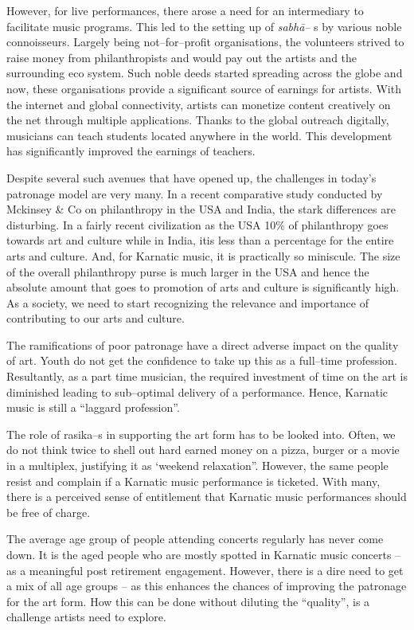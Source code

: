 However, for live performances, there arose a need for an intermediary to facilitate music programs. This led to the setting up of \textit{sabhā–} s by various noble connoisseurs. Largely being not–for–profit organisations, the volunteers strived to raise money from philanthropists and would pay out the artists and the surrounding eco system. Such noble deeds started spreading across the globe and now, these organisations provide a significant source of earnings for artists. With the internet and global connectivity, artists can monetize content creatively on the net through multiple applications. Thanks to the global outreach digitally, musicians can teach students located anywhere in the world. This development has significantly improved the earnings of teachers.

Despite several such avenues that have opened up, the challenges in today’s patronage model are very many. In a recent comparative study conducted by Mckinsey \& Co on philanthropy in the USA and India, the stark differences are disturbing. In a fairly recent civilization as the USA 10\% of philanthropy goes towards art and culture while in India, itis less than a percentage for the entire arts and culture. And, for Karnatic music, it is practically so miniscule. The size of the overall philanthropy purse is much larger in the USA and hence the absolute amount that goes to promotion of arts and culture is significantly high. As a society, we need to start recognizing the relevance and importance of contributing to our arts and culture.

The ramifications of poor patronage have a direct adverse impact on the quality of art. Youth do not get the confidence to take up this as a full–time profession. Resultantly, as a part time musician, the required investment of time on the art is diminished leading to sub–optimal delivery of a performance. Hence, Karnatic music is still a “laggard profession”.

The role of rasika–s in supporting the art form has to be looked into. Often, we do not think twice to shell out hard earned money on a pizza, burger or a movie in a multiplex, justifying it as ‘weekend relaxation”. However, the same people resist and complain if a Karnatic music performance is ticketed. With many, there is a perceived sense of entitlement that Karnatic music performances should be free of charge.

The average age group of people attending concerts regularly has never come down. It is the aged people who are mostly spotted in Karnatic music concerts – as a meaningful post retirement engagement. However, there is a dire need to get a mix of all age groups – as this enhances the chances of improving the patronage for the art form. How this can be done without diluting the “quality”, is a challenge artists need to explore.

